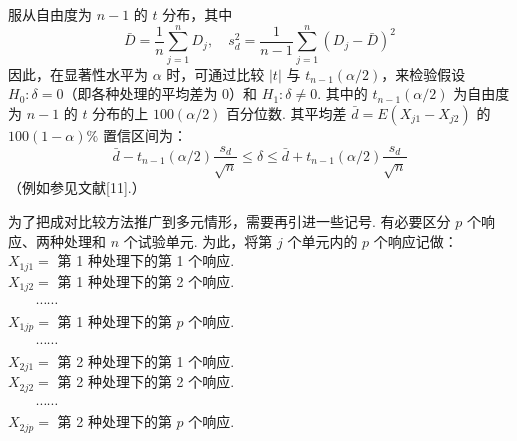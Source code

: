 服从自由度为 $n-1$ 的 $t$ 分布，其中
\label{eq:6-3}
\begin{equation}
\bar{D}=\frac{1}{n}\sum_{j=1}^n D_j,\quad s_d^2=\frac{1}{n-1}\sum_{j=1}^n(D_j-\bar{D})^2 \tag{6-3}
\end{equation}
因此，在显著性水平为 $\alpha$ 时，可通过比较 $|t|$ 与 $t_{n-1}(\alpha/2)$，来检验假设 $H_0: \delta=0$（即各种处理的平均差为 0）和 $H_1: \delta\neq 0$. 其中的 $t_{n-1}(\alpha/2)$ 为自由度为 $n-1$ 的 $t$ 分布的上 $100(\alpha/2)$ 百分位数. 其平均差 $\bar{d}=E(X_{j1}-X_{j2})$ 的 $100(1-\alpha)\%$ 置信区间为：
\label{eq:6-4}
\begin{equation}
\bar{d}-t_{n-1}(\alpha/2)\frac{s_d}{\sqrt{n}}\leqslant \delta\leqslant \bar{d}+t_{n-1}(\alpha/2)\frac{s_d}{\sqrt{n}} \tag{6-4}
\end{equation}
（例如参见文献[11].）

为了把成对比较方法推广到多元情形，需要再引进一些记号. 有必要区分 $p$ 个响应、两种处理和 $n$ 个试验单元. 为此，将第 $j$ 个单元内的 $p$ 个响应记做：\\
$X_{1j1}=$ 第 1 种处理下的第 1 个响应.\\
$X_{1j2}=$ 第 1 种处理下的第 2 个响应.\\
$\qquad\cdots\cdots$\\
$X_{1jp}=$ 第 1 种处理下的第 $p$ 个响应.\\
$\qquad\cdots\cdots$\\
$X_{2j1}=$ 第 2 种处理下的第 1 个响应.\\
$X_{2j2}=$ 第 2 种处理下的第 2 个响应.\\
$\qquad\cdots\cdots$\\
$X_{2jp}=$ 第 2 种处理下的第 $p$ 个响应.

